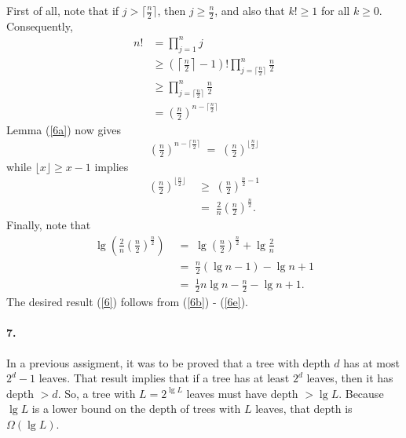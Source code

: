 \documentclass[
]{article}
\begin{document}
First of all, note that if $j > \lceil \frac{n}{2}\rceil$, then $j\geq \frac{n}{2}$, and also that $k!\geq 1$ for all $k\geq 0$.
Consequently,
\begin{align}
  \nonumber
  n!
   &=
  \prod_{j=1}^nj
  \\
  \nonumber
  &\geq 
  \left(\left \lceil \frac{n}{2}\right\rceil - 1\right)! 
  \prod_{j=\lceil\frac{n}{2}\rceil}^{n}\frac{n}{2}
  \\
  \nonumber
  &\geq
 \prod_{j=\lceil \frac{n}{2}\rceil}^{n}\frac{n}{2}
  \\
  \label{6b}
  &=
  \left(\frac{n}{2}\right)^{n-\lceil\frac{n}{2}\rceil}
\end{align}
Lemma (\ref{6a}) now gives
\begin{align}
  \label{6c}
  \left(\frac{n}{2}\right)^{n-\lceil\frac{n}{2}\rceil}
  \;=\;
  \left(\frac{n}{2}\right)^{\lfloor\frac{n}{2}\rfloor}
\end{align}
while $\lfloor x\rfloor\geq x - 1$ implies
\begin{align}
  \nonumber
  \left(\frac{n}{2}\right)^{\lfloor\frac{n}{2}\rfloor}
    &\;\geq \;
    \left(\frac{n}{2}\right)^{\frac{n}{2} - 1}
    \\
    \label{6d}
    &\;=\;
    \frac{2}{n}\left(\frac{n}{2}\right)^{\frac{n}{2}}.
\end{align}
Finally, note that
\begin{align}
  \nonumber
  \lg \left(\frac{2}{n}\left(\frac{n}{2}\right)^{\frac{n}{2}}\right)
  \;&=\;
  \lg \left(\frac{n}{2}\right)^{\frac{n}{2}} + \lg \frac{2}{n}
  \\
  \nonumber
  \;&=\;
  \frac{n}{2}(\lg n - 1) - \lg n + 1
  \\
  \label{6e}
  \;&=\;
   \frac{1}{2}n\lg n - \frac{n}{2} - \lg n + 1.
\end{align}
The desired result (\ref{6}) follows from (\ref{6b}) - (\ref{6e}).

\paragraph{7.}   In a previous assigment, it was to be proved that a tree with depth $d$ has at most $2^{d}-1$ leaves.  That result implies that if a tree has at least $2^d$ leaves, then it has depth $>d$.  So, a tree with $L=2^{\lg L}$ leaves must have depth $>\lg L$. Because $\lg L$ is a lower bound on the depth of trees with $L$ leaves, that depth is $\Omega(\lg L)$.
\end{document}
